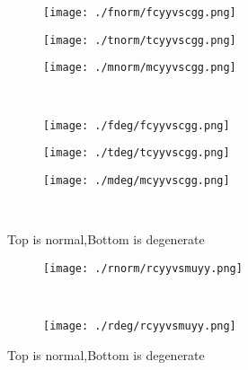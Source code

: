 \documentclass[aps,floats,floatfix,nofootinbib]{revtex4-1}
\begin{document}
\begin{center}
\begin{figure}
\begin{subfigure}{0.3\textwidth}
\texttt{[image: ./fnorm/fcyyvscgg.png]}
\label{}
\end{subfigure}
\begin{subfigure}{0.3\textwidth}
\texttt{[image: ./tnorm/tcyyvscgg.png]}
\label{}
\end{subfigure}
\begin{subfigure}{0.3\textwidth}
\texttt{[image: ./mnorm/mcyyvscgg.png]}
\label{}
\end{subfigure}\\
\begin{subfigure}{0.3\textwidth}
\texttt{[image: ./fdeg/fcyyvscgg.png]}
\label{}
\end{subfigure}
\begin{subfigure}{0.3\textwidth}
\texttt{[image: ./tdeg/tcyyvscgg.png]}
\label{}
\end{subfigure}
\begin{subfigure}{0.3\textwidth}
\texttt{[image: ./mdeg/mcyyvscgg.png]}
\label{}
\end{subfigure}\\
\caption{Top is normal,Bottom is degenerate}
\end{figure}
\end{center}

\begin{center}
\begin{figure}
\begin{subfigure}{1.0\textwidth}
\texttt{[image: ./rnorm/rcyyvsmuyy.png]}
\label{}
\end{subfigure}\\
\begin{subfigure}{1.0\textwidth}
\texttt{[image: ./rdeg/rcyyvsmuyy.png]}
\label{}
\end{subfigure}
\caption{Top is normal,Bottom is degenerate}
\end{figure}
\end{center}
\end{document}
